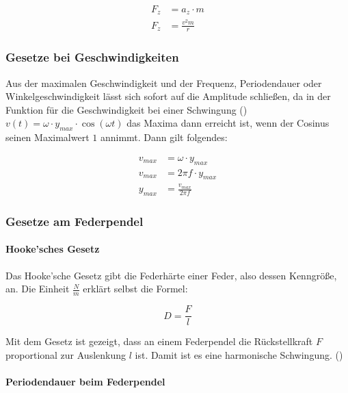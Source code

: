 \begin{align*}
	F_z &= a_z \cdot m \\
	F_z &= \frac{v^{2}m}{r}
\end{align*}


\subsubsection{Gesetze bei Geschwindigkeiten}

Aus der maximalen Geschwindigkeit und der Frequenz, Periodendauer oder Winkelgeschwindigkeit lässt sich sofort auf die Amplitude schließen, da in der Funktion für die Geschwindigkeit bei einer Schwingung () $v(t)=\omega \cdot y_{max} \cdot \cos{(\omega t)}$ das Maxima dann erreicht ist, wenn der Cosinus seinen Maximalwert $1$ annimmt. Dann gilt folgendes:

\begin{align*} \label{eq:geschwindigkeit_amplitude}
	v_{max} &= \omega \cdot y_{max} \\
	v_{max} &= 2\pi f \cdot y_{max} \\
	y_{max} &= \frac{v_{max}}{2\pi f}
\end{align*}


\subsubsection{Gesetze am Federpendel}

\paragraph{Hooke'sches Gesetz}

Das Hooke'sche Gesetz gibt die Federhärte einer Feder, also dessen Kenngröße, an. Die Einheit $\frac{N}{m}$ erklärt selbst die Formel:

\begin{equation*}
	D=\frac{F}{l}
\end{equation*}

Mit dem Gesetz ist gezeigt, dass an einem Federpendel die Rückstellkraft $F$ proportional zur Auslenkung $l$ ist. Damit ist es eine harmonische Schwingung. ()

\paragraph{Periodendauer beim Federpendel}

